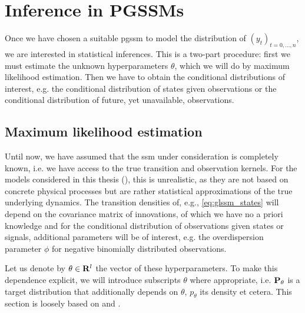 \section{Inference in PGSSMs}
\label{sec:maximum_likelihood_estimation}

Once we have chosen a suitable \gls{pgssm} to model the distribution of $\left( y_{t} \right)_{t = 0, \dots, n}$, we are interested in statistical inferences. This is a two-part procedure: first we must estimate the unknown hyperparameters $\theta$, which we will do by maximum likelihood estimation. Then we have to obtain the conditional distributions of interest, e.g. the conditional distribution of states given observations or the conditional distribution of future, yet unavailable, observations. 

\subsection{Maximum likelihood estimation}
Until now, we have assumed that the \gls{ssm} under consideration is completely known, i.e. we have access to the true transition and observation kernels. For the models considered in this thesis (), this is unrealistic, as they are not based on concrete physical processes but are rather statistical approximations of the true underlying dynamics. 
The transition densities of, e.g., \eqref{eq:glssm_states} will depend on the covariance matrix of innovations, of which we have no a priori knowledge and for the conditional distribution of observations given states or signals, additional parameters will be of interest, e.g. the overdispersion parameter $\phi$ for negative binomially distributed observations.

Let us denote by $\theta\in\R^{l}$ the vector of these hyperparameters. 
To make this dependence explicit, we will introduce subscripts $\theta$ where appropriate, i.e. $\P_{\theta}$ is a target distribution that additionally depends on $\theta$, $p_{\theta}$ its density et cetera. This section is loosely based on \citep[Chapter 7 \& 11]{Durbin2012Time} and \citep[Chapter 14]{Chopin2020Introduction}.


